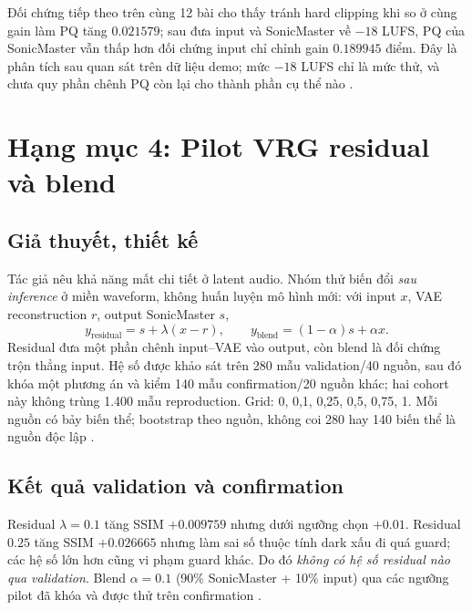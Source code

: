 \documentclass[10pt,a4paper]{article}
\begin{document}
Đối chứng tiếp theo trên cùng 12 bài cho thấy tránh hard clipping khi so ở cùng gain làm PQ tăng $0.021579$; sau đưa input và SonicMaster về $-18$ LUFS, PQ của SonicMaster vẫn thấp hơn đối chứng input chỉ chỉnh gain $0.189945$ điểm. Đây là phân tích sau quan sát trên dữ liệu demo; mức $-18$ LUFS chỉ là mức thử, và chưa quy phần chênh PQ còn lại cho thành phần cụ thể nào \cite{level}.

\section{Hạng mục 4: Pilot VRG residual và blend}
\subsection{Giả thuyết, thiết kế}
Tác giả nêu khả năng mất chi tiết ở latent audio. Nhóm thử biến đổi \emph{sau inference} ở miền waveform, không huấn luyện mô hình mới: với input $x$, VAE reconstruction $r$, output SonicMaster $s$,
\begin{equation}
y_{\mathrm{residual}}=s+\lambda(x-r),\qquad
y_{\mathrm{blend}}=(1-\alpha)s+\alpha x.
\end{equation}
Residual đưa một phần chênh input--VAE vào output, còn blend là đối chứng trộn thẳng input. Hệ số được khảo sát trên 280 mẫu validation/40 nguồn, sau đó khóa một phương án và kiểm 140 mẫu confirmation/20 nguồn khác; hai cohort này không trùng 1.400 mẫu reproduction. Grid: 0, 0,1, 0,25, 0,5, 0,75, 1. Mỗi nguồn có bảy biến thể; bootstrap theo nguồn, không coi 280 hay 140 biến thể là nguồn độc lập \cite{vrg}.

\subsection{Kết quả validation và confirmation}
Residual $\lambda=0.1$ tăng SSIM $+0.009759$ nhưng dưới ngưỡng chọn $+0.01$. Residual $0.25$ tăng SSIM $+0.026665$ nhưng làm sai số thuộc tính dark xấu đi quá guard; các hệ số lớn hơn cũng vi phạm guard khác. Do đó \emph{không có hệ số residual nào qua validation}. Blend $\alpha=0.1$ (90\% SonicMaster + 10\% input) qua các ngưỡng pilot đã khóa và được thử trên confirmation \cite{vrg}.
\end{document}
